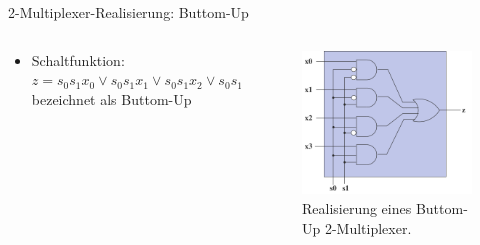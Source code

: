 \documentclass[12pt%
,xcolor=table
,aspectratio=169%
]{beamer}
\begin{document}
\begin{frame}{2-Multiplexer-Realisierung: Buttom-Up}
\begin{columns}[T] %
\begin{column}{.68\textwidth}
\begin{itemize}
	\item Schaltfunktion: $z = s_0 s_1 x_0 \lor s_0 s_1 x_1 \lor s_0 s_1 x_2 \lor s_0 s_1 x_3$ bezeichnet als Buttom-Up
\end{itemize}
\end{column}%
\hfill%
\begin{column}{.48\textwidth}
\centering
\begin{figure}
\includegraphics[scale=0.32]{pictures/mux2_bu}
\caption{Realisierung eines Buttom-Up 2-Multiplexer.}
\end{figure}
\end{column}%
\end{columns}
\end{frame}
\end{document}

